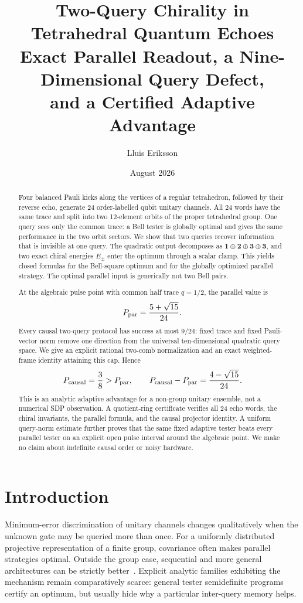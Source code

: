 \documentclass[11pt]{article}
\title{\bfseries Two-Query Chirality in Tetrahedral Quantum Echoes\\[2mm]
\large Exact Parallel Readout, a Nine-Dimensional Query Defect,\\
and a Certified Adaptive Advantage}
\author{Lluis Eriksson}
\date{August 2026}
\theoremstyle{definition}
\begin{document}
\maketitle

\begin{abstract}
Four balanced Pauli kicks along the vertices of a regular tetrahedron, followed
by their reverse echo, generate 24 order-labelled qubit unitary channels.  All
24 words have the same trace and split into two 12-element orbits of the proper
tetrahedral group.  One query sees only the common trace: a Bell tester is
globally optimal and gives the same performance in the two orbit sectors.  We
show that two queries recover information that is invisible at one query.
The quadratic output decomposes as
$\mathbf1\oplus\mathbf2\oplus\mathbf3\oplus\mathbf3$, and two exact chiral
energies $E_\pm$ enter the optimum through a scalar clamp.  This yields closed
formulas for the Bell-square optimum and for the globally optimized parallel
strategy.  The optimal parallel input is generically not two Bell pairs.

At the algebraic pulse point with common half trace $q=1/2$, the parallel value
is
\[
 P_{\rm par}=\frac{5+\sqrt{15}}{24}.
\]
Every causal two-query protocol has success at most $9/24$: fixed trace and
fixed Pauli-vector norm remove one direction from the universal ten-dimensional
quadratic query space.  We give an explicit rational two-comb normalization
and an exact weighted-frame identity attaining this cap.  Hence
\[
 P_{\rm causal}=\frac38>P_{\rm par},\qquad
 P_{\rm causal}-P_{\rm par}=\frac{4-\sqrt{15}}{24}.
\]
This is an analytic adaptive advantage for a non-group unitary ensemble, not a
numerical SDP observation.  A quotient-ring certificate verifies all 24 echo
words, the chiral invariants, the parallel formula, and the causal projector
identity.  A uniform query-norm estimate further proves that the same fixed
adaptive tester beats every parallel tester on an explicit open pulse
interval around the algebraic point.  We make no claim about indefinite
causal order or noisy hardware.
\end{abstract}

\section{Introduction}

Minimum-error discrimination of unitary channels changes qualitatively when
the unknown gate may be queried more than once.  For a uniformly distributed
projective representation of a finite group, covariance often makes parallel
strategies optimal.  Outside the group case, sequential and more general
architectures can be strictly better~\cite{bavaresco2022}.  Explicit analytic
families exhibiting the mechanism remain comparatively scarce: general
tester semidefinite programs certify an optimum, but usually hide why a
particular inter-query memory helps.
\end{document}
